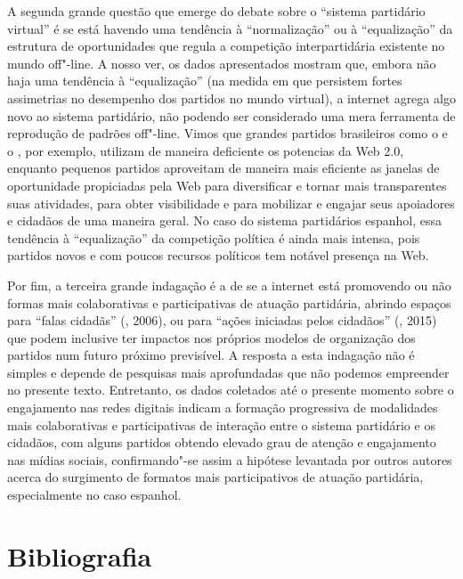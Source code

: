 A segunda grande questão que emerge do debate sobre o ``sistema
partidário virtual'' é se está havendo uma tendência à ``normalização''
ou à ``equalização'' da estrutura de oportunidades que regula a
competição interpartidária existente no mundo off"-line. A nosso ver, os
dados apresentados mostram que, embora não haja uma tendência à
``equalização'' (na medida em que persistem fortes assimetrias no
desempenho dos partidos no mundo virtual), a internet agrega algo novo
ao sistema partidário, não podendo ser considerado uma mera ferramenta
de reprodução de padrões off"-line. Vimos que grandes partidos
brasileiros como o  e o , por exemplo, utilizam de maneira
deficiente os potencias da Web 2.0, enquanto pequenos partidos
aproveitam de maneira mais eficiente as janelas de oportunidade
propiciadas pela Web para diversificar e tornar mais transparentes suas
atividades, para obter visibilidade e para mobilizar e engajar seus
apoiadores e cidadãos de uma maneira geral. No caso do sistema
partidários espanhol, essa tendência à ``equalização'' da competição
política é ainda mais intensa, pois partidos novos e com poucos recursos
políticos tem notável presença na Web.

Por fim, a terceira grande indagação é a de se a internet está
promovendo ou não formas mais colaborativas e participativas de atuação
partidária, abrindo espaços para ``falas cidadãs'' (, 2006), ou
para ``ações iniciadas pelos cidadãos'' (, 2015) que podem
inclusive ter impactos nos próprios modelos de organização dos partidos
num futuro próximo previsível. A resposta a esta indagação não é simples
e depende de pesquisas mais aprofundadas que não podemos empreender no
presente texto. Entretanto, os dados coletados até o presente momento
sobre o engajamento nas redes digitais indicam a formação progressiva de
modalidades mais colaborativas e participativas de interação entre o
sistema partidário e os cidadãos, com alguns partidos obtendo elevado
grau de atenção e engajamento nas mídias sociais, confirmando"-se assim a
hipótese levantada por outros autores acerca do surgimento de formatos
mais participativos de atuação partidária, especialmente no caso
espanhol.

\section{Bibliografia}

